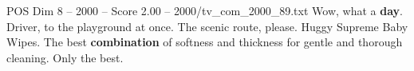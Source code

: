 \begin{textsample}{POS Dim 8 – 2000 – Score 2.00 – 2000/tv\_com\_2000\_89.txt}  \label{ex:f8_pos_035}
Wow, what a \textbf{day}.
Driver, to the playground at once.
The scenic route, please.
Huggy Supreme Baby Wipes.
The best \textbf{combination} of softness and thickness for gentle and thorough cleaning.
Only the best.

\end{textsample}
